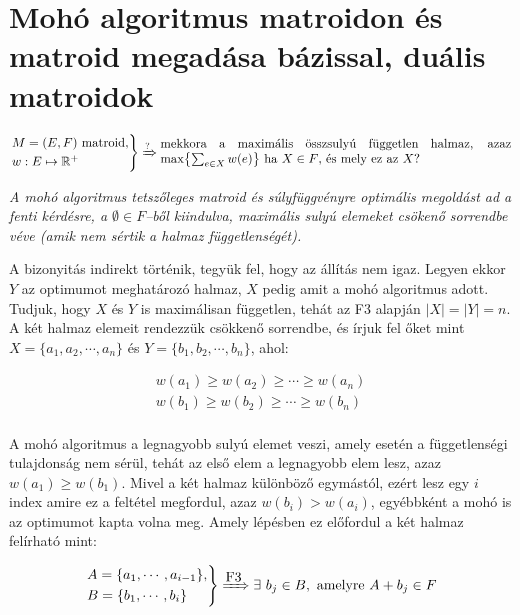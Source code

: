 \section{Mohó algoritmus matroidon és matroid megadása bázissal, duális matroidok}

\[
	\begin{rcases}
		M=(E,F) \mbox{ matroid}, \\
		w : E \mapsto \mathbb{R}^+
	\end{rcases}
	\xRightarrow{?} \parbox[L]{9.8cm}{mekkora a maximális összsulyú független halmaz,
	azaz max$\left\{\sum_{e \in X}w(e)\right\}$ ha $X \in F$, és mely ez az $X$?} %
\]

\vspace{0.4cm}
\emph{A mohó algoritmus tetszőleges matroid és súlyfüggvényre optimális
	megoldást ad a fenti kérdésre, a $\emptyset \in F$--ből kiindulva, maximális
	sulyú elemeket csökenő sorrendbe véve (amik nem sértik a halmaz
	függetlenségét).}
\vspace{0.4cm}

A bizonyitás indirekt történik, tegyük fel, hogy az állítás nem igaz. Legyen
ekkor $Y$ az optimumot meghatározó halmaz, $X$ pedig amit a mohó algoritmus adott. Tudjuk,
hogy $X$ és $Y$ is maximálisan független, tehát az F$3$ alapján $|X|=|Y|=n$. A
két halmaz elemeit rendezzük csökkenő sorrendbe, és írjuk fel őket mint
$X=\{a_1, a_2, \cdots, a_n\}$ és $Y=\{b_1, b_2, \cdots, b_n\}$, ahol:

\begin{align*}
	w(a_1) \geq w(a_2) \geq \cdots \geq w(a_n) \\
	w(b_1) \geq w(b_2) \geq \cdots \geq w(b_n) \\
\end{align*}

A mohó algoritmus a legnagyobb sulyú elemet veszi, amely esetén a
függetlenségi tulajdonság nem sérül, tehát az első elem a legnagyobb elem lesz,
azaz $w(a_1) \geq w(b_1)$. Mivel a két halmaz különböző egymástól, ezért lesz
egy $i$ index amire ez a feltétel megfordul, azaz $ w(b_i)> w(a_i)$, egyébbként
a mohó is az optimumot kapta volna meg. Amely lépésben ez előfordul a két halmaz
felírható mint:

\[
	\begin{rcases}
		A=\{a_1, \cdots, a_{i-1}\}, \\
		B=\{b_1, \cdots, b_{i}\}
	\end{rcases}
	\xRightarrow{\mbox{F3}} \exists~b_j \in B, \mbox{ amelyre } A + b_j \in F
\]

